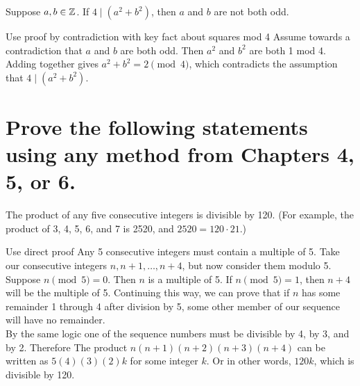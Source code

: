 \documentclass{article}
\begin{document}
\begin{problem}
Suppose $a, b \in \mathbb{Z}$. If $4 \mid (a^2 + b^2)$, then $a$ and $b$ are not both odd.
\end{problem}
\begin{solution}{Use proof by contradiction with key fact about squares mod 4}
  Assume towards a contradiction that $a$ and $b$ are both odd. Then $a^2$ and $b^2$ are both 1 mod 4. Adding together gives $a^2 + b^2 = 2 \pmod{4}$, which contradicts the assumption that $4 \mid (a^2 + b^2)$.
\end{solution}


\section{Prove the following statements using any method from Chapters 4, 5, or 6.}

\begin{problem}
The product of any five consecutive integers is divisible by 120. (For example, the product of 3, 4, 5, 6, and 7 is 2520, and $2520 = 120 \cdot 21$.)
\end{problem}
\begin{solution}{Use direct proof}
  Any 5 consecutive integers must contain a multiple of 5. Take our consecutive integers $n, n+1, \ldots, n + 4$, but now consider them modulo 5. Suppose $n \pmod{5} = 0$. Then $n$ is a multiple of 5. If $n \pmod{5} = 1$, then $n + 4$ will be the multiple of 5. Continuing this way, we can prove that if $n$ has some remainder 1 through 4 after division by 5, some other member of our sequence will have no remainder.\\

  By the same logic one of the sequence numbers must be divisible by 4, by 3, and by 2. Therefore The product $n(n+1)(n+2)(n+3)(n+4)$ can be written as $5(4)(3)(2)k$ for some integer $k$. Or in other words, $120k$, which is divisible by 120.

\end{solution}
\end{document}

